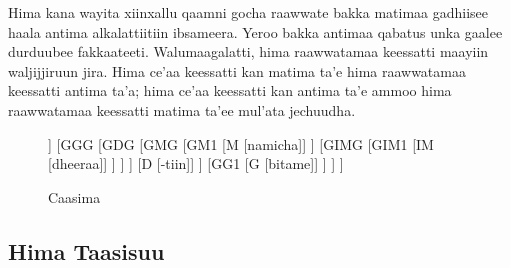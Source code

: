 \documentclass[11pt,b5paper]{book}
\begin{document}
Hima kana wayita xiinxallu qaamni gocha raawwate bakka matimaa gadhiisee haala antima alkalattiitiin ibsameera. Yeroo bakka antimaa qabatus unka gaalee durduubee fakkaateeti. Walumaagalatti, hima raawwatamaa keessatti maayiin waljijjiruun jira. Hima ce'aa keessatti kan matima ta'e hima raawwatamaa keessatti antima ta'a; hima ce'aa keessatti kan antima ta'e ammoo hima raawwatamaa keessatti matima ta'ee mul'ata jechuudha.

\begin{figure}[H]										
	\caption{Caasima}
	\centering
	\begin{forest}
		[H
			[GMG [f]]
			[GGG
				[GDG
					[GMG
						[GM1
							[M [namicha]]
						]
						[GIMG
							[GIM1
								[IM [dheeraa]]
							]
						]
					]
					[D [-tiin]]
				]
				[GG1
					[G [bitame]]
				]
			]
		]		
	\end{forest}
\end{figure}



\subsection{Hima Taasisuu}


















\newpage



\end{document}
